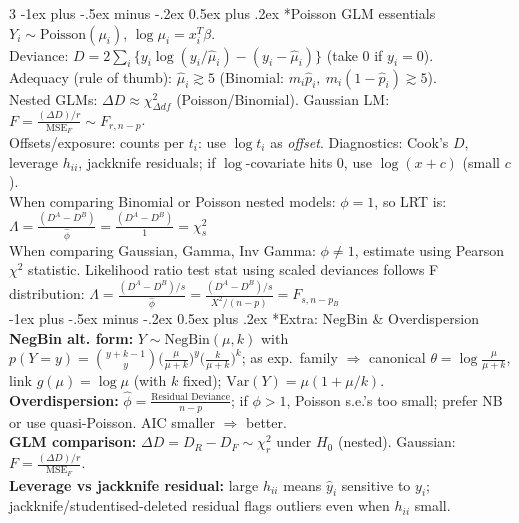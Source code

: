 \documentclass[10pt,landscape]{article}
\makeatletter
\renewcommand{\section}{\@startsection{section}{1}{0mm}%
                                {-1ex plus -.5ex minus -.2ex}%
                                {0.5ex plus .2ex}%
                                {\normalfont\normalsize\bfseries}}
\renewcommand{\subsection}{\@startsection{subsection}{2}{0mm}%
                                {-1ex plus -.5ex minus -.2ex}%
                                {0.5ex plus .2ex}%
                                {\normalfont\small\bfseries}}
\makeatother
\begin{document}
\begin{multicols}{3}
\subsection*{Poisson GLM essentials}
$Y_i\sim\text{Poisson}(\mu_i)$, $\log\mu_i=x_i^T\beta$.\\
Deviance: $D=2\sum_i\{y_i\log(y_i/\hat\mu_i)-(y_i-\hat\mu_i)\}$ (take $0$ if $y_i=0$).\\
Adequacy (rule of thumb): $\hat\mu_i\gtrsim5$ (Binomial: $m_i\hat p_i,\ m_i(1-\hat p_i)\gtrsim5$).\\
Nested GLMs: $\Delta D\approx\chi^2_{\Delta df}$ (Poisson/Binomial). Gaussian LM: $F=\frac{(\Delta D)/r}{\text{MSE}_F}\sim F_{r,n-p}$.\\
Offsets/exposure: counts per $t_i$: use $\log t_i$ as \emph{offset}. Diagnostics: Cook's $D$, leverage $h_{ii}$, jackknife residuals; if $\log$-covariate hits 0, use $\log(x+c)$ (small $c$).\\
\medskip
When comparing Binomial or Poisson nested models: $\phi=1$, so LRT is:
$\Lambda=\frac{(D^A-D^B)}{\widehat{\phi}}=\frac{(D^A-D^B)}{1}=\chi^2_s$\\
\medskip
When comparing Gaussian, Gamma, Inv Gamma: $\phi\neq 1$, estimate using Pearson $\chi^2$ statistic. Likelihood ratio test stat using scaled deviances follows F distribution:
$\Lambda=\frac{(D^A-D^B)/s}{\widehat{\phi}}=\frac{(D^A-D^B)/s}{X^2/(n-p)}=F_{s,n-p_B}$\\
\section*{Extra: NegBin \& Overdispersion}
\textbf{NegBin alt. form: } $Y\sim\text{NegBin}(\mu,k)$ with
$p(Y=y)=\binom{y+k-1}{y}\Big(\frac{\mu}{\mu+k}\Big)^y\Big(\frac{k}{\mu+k}\Big)^k$;
as exp.\ family $\Rightarrow$ canonical $\theta=\log\frac{\mu}{\mu+k}$, link $g(\mu)=\log\mu$ (with $k$ fixed); $\mathrm{Var}(Y)=\mu(1+\mu/k)$.\\
\textbf{Overdispersion: } $\widehat\phi=\frac{\text{Residual Deviance}}{n-p}$; if $\phi>1$, Poisson s.e.'s too small; prefer NB or use quasi-Poisson. AIC smaller $\Rightarrow$ better.\\
\textbf{GLM comparison: } $\Delta D=D_R-D_F\sim\chi^2_r$ under $H_0$ (nested). Gaussian: $F=\frac{(\Delta D)/r}{\text{MSE}_F}$.\\
\textbf{Leverage vs jackknife residual: } large $h_{ii}$ means $\hat y_i$ sensitive to $y_i$; jackknife/studentised-deleted residual flags outliers even when $h_{ii}$ small.\\


\end{multicols}
\end{document}
